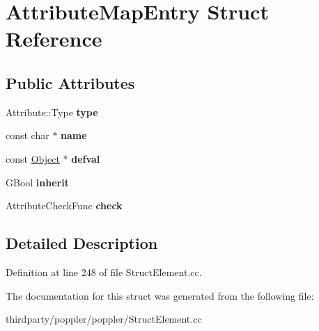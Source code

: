\hypertarget{struct_attribute_map_entry}{}\section{Attribute\+Map\+Entry Struct Reference}
\label{struct_attribute_map_entry}
\subsection*{Public Attributes}
\begin{DoxyCompactItemize}
\item 
\mbox{\label{struct_attribute_map_entry_addb5f4818a14913d2ae62d77fd641232}} 
Attribute\+::\+Type {\bfseries type}
\item 
\mbox{\label{struct_attribute_map_entry_a30a93cbaa8f4276a47b55bc30bdf862e}} 
const char $\ast$ {\bfseries name}
\item 
\mbox{\label{struct_attribute_map_entry_ab8bf004f8b832f6e4cb1148a9ec3b30a}} 
const \hyperlink{class_object}{Object} $\ast$ {\bfseries defval}
\item 
\mbox{\label{struct_attribute_map_entry_a715c5d3a078f45d8fc4a752377001c27}} 
G\+Bool {\bfseries inherit}
\item 
\mbox{\label{struct_attribute_map_entry_a4df669afdbb0c70a1e3d68e77783a53b}} 
Attribute\+Check\+Func {\bfseries check}
\end{DoxyCompactItemize}


\subsection{Detailed Description}


Definition at line 248 of file Struct\+Element.\+cc.



The documentation for this struct was generated from the following file\+:\begin{DoxyCompactItemize}
\item 
thirdparty/poppler/poppler/Struct\+Element.\+cc\end{DoxyCompactItemize}
